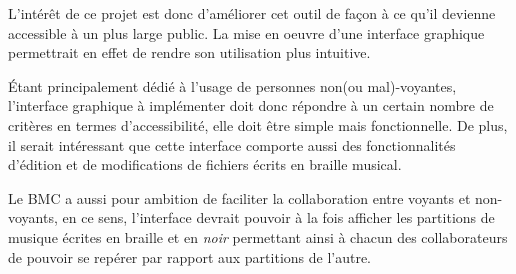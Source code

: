 L'intérêt de ce projet est donc d'améliorer cet outil de façon à ce qu'il devienne accessible à un plus large public. La mise en oeuvre d'une interface graphique permettrait en effet de rendre son utilisation plus intuitive.

  Étant principalement dédié à l'usage de personnes non(ou mal)-voyantes, l'interface graphique à implémenter doit donc répondre à un certain nombre de critères en termes d'accessibilité, elle doit être simple mais fonctionnelle.
  De plus, il serait intéressant que cette interface comporte aussi des fonctionnalités d'édition et de modifications de fichiers écrits en braille musical.
   
  Le BMC a aussi pour ambition de faciliter la collaboration entre voyants et non-voyants, en ce sens, l'interface devrait pouvoir à la fois afficher les partitions de musique écrites en braille et en \textit{noir} permettant ainsi à chacun des collaborateurs de pouvoir se repérer par rapport aux partitions de l'autre.    
